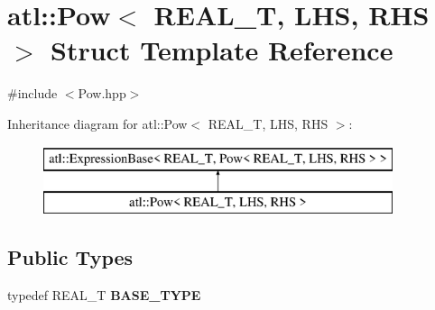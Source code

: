 \hypertarget{structatl_1_1_pow}{\section{atl\+:\+:Pow$<$ R\+E\+A\+L\+\_\+\+T, L\+H\+S, R\+H\+S $>$ Struct Template Reference}
\label{structatl_1_1_pow}
}


{\ttfamily \#include $<$Pow.\+hpp$>$}

Inheritance diagram for atl\+:\+:Pow$<$ R\+E\+A\+L\+\_\+\+T, L\+H\+S, R\+H\+S $>$\+:\begin{figure}[H]
\begin{center}
\leavevmode
\includegraphics[height=2.000000cm]{structatl_1_1_pow}
\end{center}
\end{figure}
\subsection*{Public Types}
\begin{DoxyCompactItemize}
\item 
\hypertarget{structatl_1_1_pow_a8b99b01478601e39de33f01be84b68db}{typedef R\+E\+A\+L\+\_\+\+T {\bfseries B\+A\+S\+E\+\_\+\+T\+Y\+P\+E}}\label{structatl_1_1_pow_a8b99b01478601e39de33f01be84b68db}

\end{DoxyCompactItemize}
